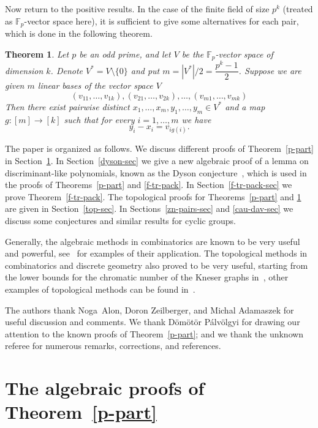 \documentclass[12pt,a4paper]{amsart}
\newtheorem{thm}{Theorem}
\theoremstyle{definition}
\theoremstyle{remark}
\begin{document}
Now return to the positive results. In the case of the finite field of size $p^k$ (treated as ${{\mathbb F_p}}$-vector space here), it is sufficient to give some alternatives for each pair, which is done in the following theorem.

\begin{thm}
\label{pk-part}
Let $p$ be an odd prime, and let $V$ be the ${{\mathbb F_p}}$-vector space of dimension $k$. Denote $V^* = V\setminus\{0\}$ and put $m=|V^*|/2=\dfrac{p^k-1}{2}$. Suppose we are given $m$ linear bases of the vector space $V$
$$
(v_{11}, \ldots, v_{1k}), (v_{21}, \ldots, v_{2k}),\ldots, (v_{m1}, \ldots, v_{mk})
$$
Then there exist pairwise distinct $x_1,\ldots, x_m, y_1,\ldots, y_m \in V^*$ and
a map $g : [m]\to [k]$ such that for every $i=1,\ldots, m$ we have
$$
y_i-x_i = v_{ig(i)}.
$$
\end{thm}

The paper is organized as follows. We discuss different proofs of Theorem~\ref{p-part} in Section~\ref{p-part-sec}. In Section~\ref{dyson-sec} we give a new algebraic proof of a lemma on discriminant-like polynomials, known as the Dyson conjecture~\cite{dyson1962}, which is used in the proofs of Theorems~\ref{p-part} and \ref{f-tr-pack}. In Section~\ref{f-tr-pack-sec} we prove Theorem~\ref{f-tr-pack}. The topological proofs for Theorems~\ref{p-part} and \ref{pk-part} are given in Section~\ref{top-sec}. In Sections~\ref{zn-pairs-sec} and \ref{cau-dav-sec} we discuss some conjectures and similar results for cyclic groups.

Generally, the algebraic methods in combinatorics are known to be very useful and powerful, see~\cite{frwi1981,kaka1993,alon1999} for examples of their application. The topological methods in combinatorics and discrete geometry also proved to be very useful, starting from the lower bounds for the chromatic number of the Kneser graphs in~\cite{lov1978}, other examples of topological methods can be found in~\cite{mat2003,ziv2004}.

The authors thank Noga~Alon, Doron Zeilberger, and Michal Adamaszek for useful discussion and comments. We  thank D\"om\"ot\"or P\'alv\"olgyi for drawing our attention to the known proofs of Theorem~\ref{p-part}; and we thank the unknown referee for numerous remarks, corrections, and references.

\section{The algebraic proofs of Theorem~\ref{p-part}}
\label{p-part-sec}
\end{document}
